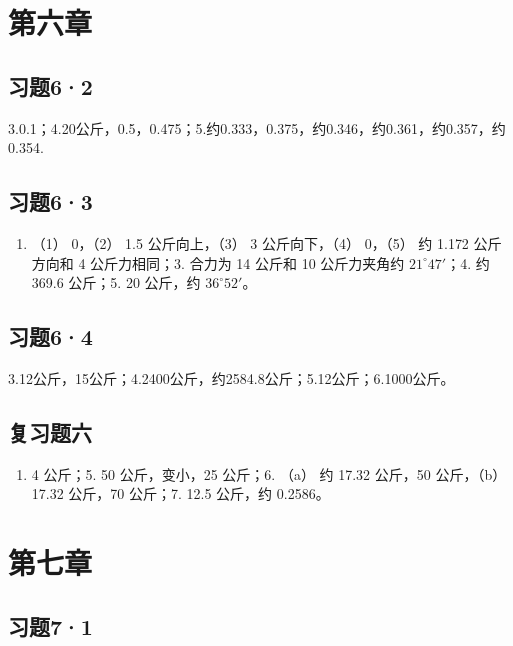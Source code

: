\section{第六章}\label{ux7b2cux516dux7ae0}

\subsection{习题6·2}\label{ux4e60ux989862-1}

3.0.1；4.20公斤，0.5，0.475；5.约0.333，0.375，约0.346，约0.361，约0.357，约0.354.

\subsection{习题6·3}\label{ux4e60ux989863-1}

\begin{enumerate}
\def\labelenumi{\arabic{enumi}.}
\setcounter{enumi}{1}
\tightlist
\item
  （1） 0，（2） 1.5 公斤向上，（3） 3 公斤向下，（4） 0，（5） 约 1.172
  公斤方向和 4 公斤力相同；3. 合力为 14 公斤和 10 公斤力夹角约
  \(21^{\circ}47'\)；4. 约 369.6 公斤；5. 20 公斤，约
  \(36^{\circ}52'\)。
\end{enumerate}

\subsection{习题6·4}\label{ux4e60ux989864-1}

3.12公斤，15公斤；4.2400公斤，约2584.8公斤；5.12公斤；6.1000公斤。

\subsection{复习题六}\label{ux590dux4e60ux9898ux516d-1}

\begin{enumerate}
\def\labelenumi{\arabic{enumi}.}
\setcounter{enumi}{3}
\tightlist
\item
  4 公斤；5. 50 公斤，变小，25 公斤；6. （a） 约 17.32 公斤，50
  公斤，（b） 17.32 公斤，70 公斤；7. 12.5 公斤，约 0.2586。
\end{enumerate}

\section{第七章}\label{ux7b2cux4e03ux7ae0}

\subsection{习题7·1}\label{ux4e60ux989871-1}

